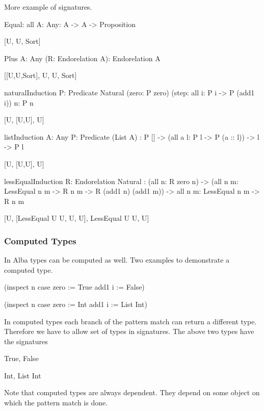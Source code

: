 More example of signatures.
%
\begin{alba}

    Equal: all {A: Any}: A -> A -> Proposition

        [U, U, Sort]


    Plus {A: Any} (R: Endorelation A): Endorelation A

        [[U,U,Sort], U, U, Sort]


    naturalInduction
        {P: Predicate Natural}
        (zero: P zero) (step: all {i}: P i -> P (add1 i))
        {n}: P n

        [U, [U,U], U]


    listInduction
        {A: Any} {P: Predicate (List A)}
        : P [] -> (all {a l}: P l -> P (a :: l)) -> {l} -> P l

        [U, [U,U], U]


    lessEqualInduction {R: Endorelation Natural}
        :   (all {n}: R zero n)
            -> (all {n m}: LessEqual n m -> R n m -> R (add1 n) (add1 m))
            -> all {n m}: LessEqual n m -> R n m

        [U, [LessEqual U U, U, U], LessEqual U U, U]

\end{alba}




\subsubsection{Computed Types}

In Alba types can be computed as well. Two examples to demonstrate a computed
type.
%
\begin{alba}
    (inspect n case
        zero := True
        add1 i := False)

    (inspect n case
        zero := Int
        add1 i := List Int)
\end{alba}
%
In computed types each branch of the pattern match can return a different type.
Therefore we have to allow set of types in signatures. The above two types have
the signatures
%
\begin{alba}
    {True, False}

    {Int, List Int}
\end{alba}

Note that computed types are always dependent. They depend on some object on
which the pattern match is done.







